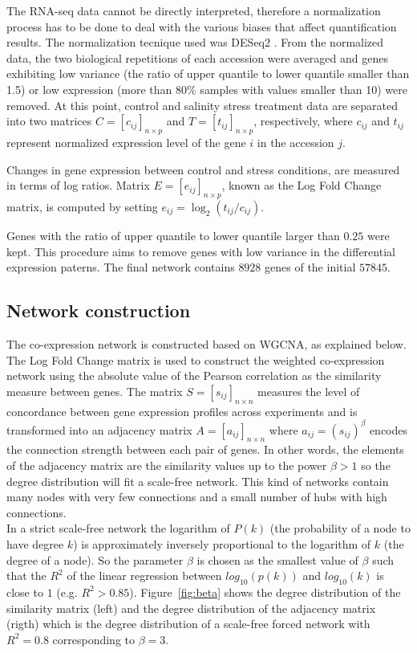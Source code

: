 \documentclass[conference]{IEEEtran}
\begin{document}
The RNA-seq data cannot be directly interpreted, therefore a normalization process has to be done to deal with the various biases that affect quantification results. The normalization tecnique used was DESeq2 \cite{love2014moderated}. From the normalized data, the two biological repetitions of each accession were averaged and genes exhibiting low variance (the ratio of upper quantile to lower quantile smaller than 1.5) or low expression (more than 80\% samples with values smaller than 10) were removed. At this point, control and salinity stress treatment data are separated into two matrices $C=[c_{ij}]_{n \times p}$ and $T=[t_{ij}]_{n \times p}$, respectively, where $c_{ij}$ and $t_{ij}$ represent normalized expression level of the gene $i$ in the accession $j$.

Changes in gene expression between control and stress conditions, are measured in terms of log ratios. Matrix $E=[e_{ij}]_{n \times p}$, known as the Log Fold Change matrix, is computed by setting $e_{ij}=\log_2 (t_{ij}/c_{ij})$. 

Genes with the ratio of upper quantile to lower quantile larger than $0.25$ were kept. This procedure aims to remove genes with low variance in the differential expression paterns. The final network contains $8928$ genes of the initial $57845$.


\subsection{Network construction}
The co-expression network is constructed based on WGCNA, as explained below.\\

The Log Fold Change matrix is used to construct the weighted co-expression network using the absolute value of the Pearson correlation as the similarity measure between genes. The matrix $S=[s_{ij}]_{n\times n}$ measures the level of concordance between gene expression profiles across experiments and is transformed into an adjacency matrix $A=[a_{ij}]_{n\times n}$ where $a_{ij} = (s_{ij})^\beta $ encodes the connection strength between each pair of genes. In other words, the elements of the adjacency matrix are the similarity values up to the power $\beta > 1$ so the degree distribution will fit a scale-free network. This kind of networks contain many nodes with very few connections and a small number of hubs with high connections. \\

In a strict scale-free network the logarithm of $P(k)$ (the probability of a node to have degree $k$) is approximately inversely proportional to the logarithm of $k$ (the degree of a node). So the parameter $\beta$ is chosen as the smallest value of $\beta$ such that the $R^2$ of the linear regression between $log_{10}(p(k))$ and $log_{10}(k)$ is close to $1$ (e.g. $R^2 > 0.85$). Figure~\ref{fig:beta} shows the degree distribution of the similarity matrix (left) and the degree distribution of the adjacency matrix (rigth) which is the degree distribution of a scale-free forced network with $R^2 = 0.8$ corresponding to $\beta = 3$.
\end{document}

